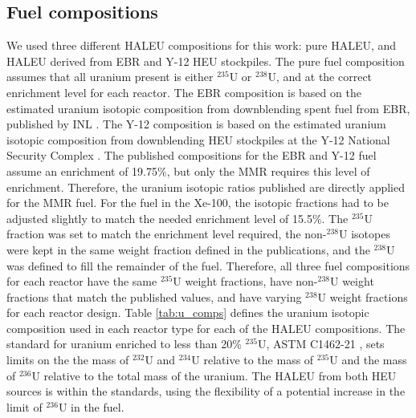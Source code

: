 \subsection{Fuel compositions}
We used three different \gls{HALEU} compositions for this work: pure 
\gls{HALEU}, and \gls{HALEU} derived from \gls{EBR} and Y-12 \gls{HEU} 
stockpiles. The pure fuel composition assumes that all uranium present is 
either $^{235}$U or $^{238}$U, and at the correct enrichment level for each 
reactor. The \gls{EBR} 
composition is based on the estimated uranium isotopic composition from 
downblending spent fuel from \gls{EBR}, published by \gls{INL} 
\cite{vaden_isotopic_2018}. The Y-12 composition is based on the 
estimated uranium isotopic composition from downblending \gls{HEU} 
stockpiles at the Y-12 National Security Complex \cite{nelson_foreign_2010}.
The published compositions for the \gls{EBR} and Y-12 fuel assume an enrichment 
of 19.75\%, but only the \gls{MMR} requires this level of enrichment. 
Therefore, the uranium isotopic ratios 
published are directly applied for the \gls{MMR} fuel. For the fuel in the 
Xe-100, the isotopic fractions had to be adjusted slightly to match the 
needed enrichment level of 15.5\%. The $^{235}$U fraction was set to match 
the 
enrichment level required, the non-$^{238}$U isotopes were kept in the 
same weight fraction defined in the publications, and the $^{238}$U was 
defined to fill the remainder of the fuel. Therefore, all three fuel compositions for each 
reactor have the same $^{235}$U weight fractions, have non-$^{238}$U weight
fractions that match the published values, and have varying $^{238}$U 
weight fractions for each reactor design. Table \ref{tab:u_comps} defines 
the uranium isotopic composition used 
in each reactor type for each of the \gls{HALEU} compositions. The 
standard for uranium enriched to less than 20\% $^{235}$U, ASTM C1462-21 
\cite{noauthor_standard_2021-1}, sets limits on the the mass of 
$^{232}$U and $^{234}$U relative to the mass of $^{235}$U and the mass of 
$^{236}$U relative to the total mass of the uranium.
The \gls{HALEU} from both \gls{HEU} sources is within the standards, 
using the flexibility of a potential increase in the limit of 
$^{236}$U in the fuel. 

